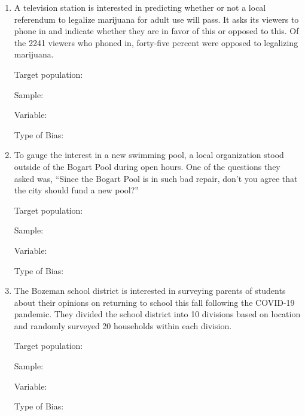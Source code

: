 \documentclass[
]{report}
\begin{document}
\begin{enumerate}
\def\labelenumi{\arabic{enumi}.}
\setcounter{enumi}{2}
\item
  A television station is interested in predicting whether or not a local referendum to legalize marijuana for adult use will pass. It asks its viewers to phone in and indicate whether they are in favor of this or opposed to this. Of the 2241 viewers who phoned in, forty-five percent were opposed to legalizing marijuana.
  \vspace{0.1in}

  Target population:
  \vspace{0.3in}

  Sample:
  \vspace{0.3in}

  Variable:
  \vspace{0.3in}

  Type of Bias:
  \vspace{0.3in}
\item
  To gauge the interest in a new swimming pool, a local organization stood outside of the Bogart Pool during open hours. One of the questions they asked was, ``Since the Bogart Pool is in such bad repair, don't you agree that the city should fund a new pool?''\\
  \vspace{0.1in}

  Target population:
  \vspace{0.3in}

  Sample:
  \vspace{0.3in}

  Variable:
  \vspace{0.3in}

  Type of Bias:
  \vspace{0.3in}
\item
  The Bozeman school district is interested in surveying parents of students about their opinions on returning to school this fall following the COVID-19 pandemic. They divided the school district into 10 divisions based on location and randomly surveyed 20 households within each division.
  \vspace{0.1in}

  Target population:
  \vspace{0.3in}

  Sample:
  \vspace{0.3in}

  Variable:
  \vspace{0.3in}

  Type of Bias:
  \vspace{0.3in}
\end{enumerate}
\end{document}
